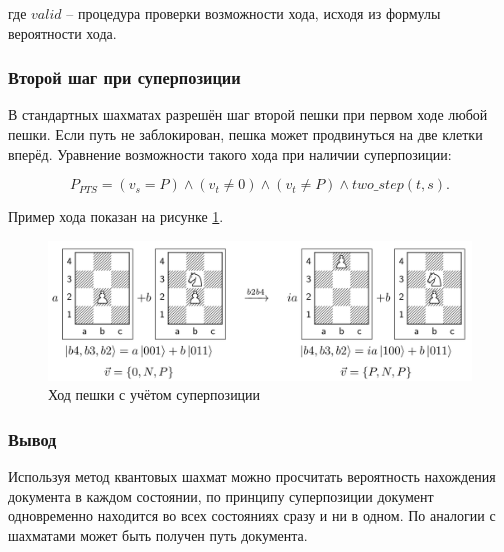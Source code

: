 где $valid$ -- процедура проверки возможности хода, исходя из формулы вероятности хода.

\subsubsection{Второй шаг при суперпозиции} 

В стандартных шахматах разрешён шаг второй пешки при первом ходе любой пешки. Если путь не заблокирован, пешка может продвинуться на две клетки вперёд. Уравнение возможности такого хода при наличии суперпозиции:

\begin{equation}
	P_{PTS} = (v_s = P) \wedge (v_t \neq 0) \wedge (v_t \neq P) \wedge two\_step(t,s).
\end{equation}

Пример хода показан на рисунке \ref{fig:twostep}.

\begin{figure}[h!btp]
	\centering
	\includegraphics[width=1\textwidth]{inc/twostep.png}
	\caption{{Ход пешки с учётом суперпозиции}}
	\label{fig:twostep}
\end{figure}

\subsubsection{Вывод}

Используя метод квантовых шахмат можно просчитать вероятность нахождения документа в каждом состоянии, по принципу суперпозиции документ одновременно находится во всех состояниях сразу и ни в одном. По аналогии с шахматами может быть получен путь документа.

\clearpage

